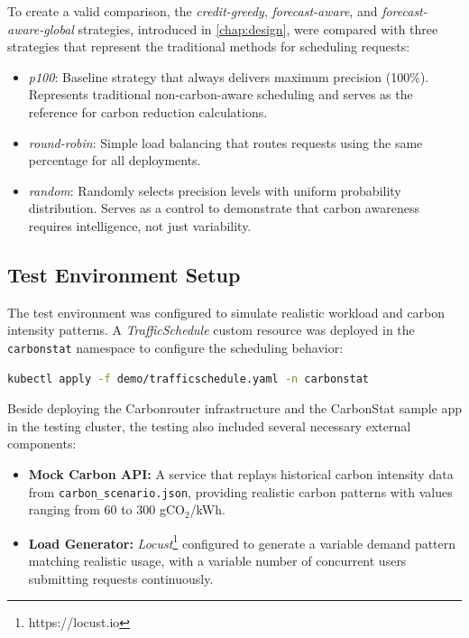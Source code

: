 To create a valid comparison, the \textit{credit-greedy}, \textit{forecast-aware}, and \textit{forecast-aware-global} strategies, introduced in \cref{chap:design}, were compared with three strategies that represent the traditional methods for scheduling requests:

\begin{itemize}
    \item \textit{p100}: Baseline strategy that always delivers maximum precision (100\%). Represents traditional non-carbon-aware scheduling and serves as the reference for carbon reduction calculations.
    \item \textit{round-robin}: Simple load balancing that routes requests using the same percentage for all deployments.
    \item \textit{random}: Randomly selects precision levels with uniform probability distribution. Serves as a control to demonstrate that carbon awareness requires intelligence, not just variability.
\end{itemize}

\subsection{Test Environment Setup}

The test environment was configured to simulate realistic workload and carbon intensity patterns. A \textit{TrafficSchedule} custom resource was deployed in the \texttt{carbonstat} namespace to configure the scheduling behavior:

\begin{lstlisting}[language=bash,caption={Deployment of the TrafficSchedule resource.},label=lst:traffic-schedule-deploy]
kubectl apply -f demo/trafficschedule.yaml -n carbonstat
\end{lstlisting}

Beside deploying the Carbonrouter infrastructure and the CarbonStat sample app in the testing cluster, the testing also included several necessary external components: 

\begin{itemize}
    \item \textbf{Mock Carbon API:} A service that replays historical carbon intensity data from \texttt{carbon\_scenario.json}, providing realistic carbon patterns with values ranging from 60 to 300 gCO$_2$/kWh. 
    \item \textbf{Load Generator:} \textit{Locust}\footnote{https://locust.io} configured to generate a variable demand pattern matching realistic usage, with a variable number of concurrent users submitting requests continuously.
\end{itemize}

